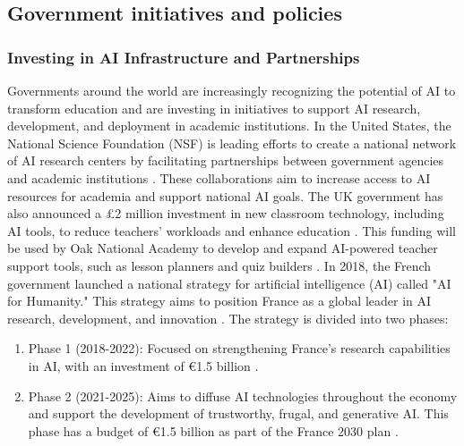 \documentclass{article}
\begin{document}
\subsection{Government initiatives and policies}
\subsubsection{Investing in AI Infrastructure and Partnerships}
Governments around the world are increasingly recognizing the potential of AI to transform education and are investing in initiatives to support AI research, development, and deployment in academic institutions. In the United States, the National Science Foundation (NSF) is leading efforts to create a national network of AI research centers by facilitating partnerships between government agencies and academic institutions \cite{https://www2.datainnovation.org/2022-ai-universities.pdf}. These collaborations aim to increase access to AI resources for academia and support national AI goals.
The UK government has also announced a £2 million investment in new classroom technology, including AI tools, to reduce teachers' workloads and enhance education \cite{https://dig.watch/updates/uk-government-invests-2-million-in-ai-classroom-technology} \cite{https://www.openaccessgovernment.org/uk-government-invests-in-ai-powered-teacher-support/169271/}. This funding will be used by Oak National Academy to develop and expand AI-powered teacher support tools, such as lesson planners and quiz builders \cite{https://www.gov.uk/government/news/new-support-for-teachers-powered-by-artificial-intelligence} \cite{https://www.openaccessgovernment.org/uk-government-invests-in-ai-powered-teacher-support/169271/}.
In 2018, the French government launched a national strategy for artificial intelligence (AI) called "AI for Humanity." This strategy aims to position France as a global leader in AI research, development, and innovation \cite{https://www.economie.gouv.fr/strategie-nationale-intelligence-artificielle} \cite{https://www.entreprises.gouv.fr/fr/numerique/enjeux/la-strategie-nationale-pour-l-ia}. The strategy is divided into two phases:
\begin{enumerate}
    \item Phase 1 (2018-2022): Focused on strengthening France's research capabilities in AI, with an investment of €1.5 billion \cite{https://www.economie.gouv.fr/strategie-nationale-intelligence-artificielle} \cite{https://www.entreprises.gouv.fr/fr/numerique/enjeux/la-strategie-nationale-pour-l-ia} \cite{https://www.enseignementsup-recherche.gouv.fr/fr/la-strategie-france-ia-soutenir-la-dynamique-francaise-autour-de-l-intelligence-artificielle-46305}.
    \item Phase 2 (2021-2025): Aims to diffuse AI technologies throughout the economy and support the development of trustworthy, frugal, and generative AI. This phase has a budget of €1.5 billion as part of the France 2030 plan \cite{https://www.economie.gouv.fr/strategie-nationale-intelligence-artificielle} \cite{https://www.entreprises.gouv.fr/fr/numerique/enjeux/la-strategie-nationale-pour-l-ia}.
\end{enumerate}
\end{document}
